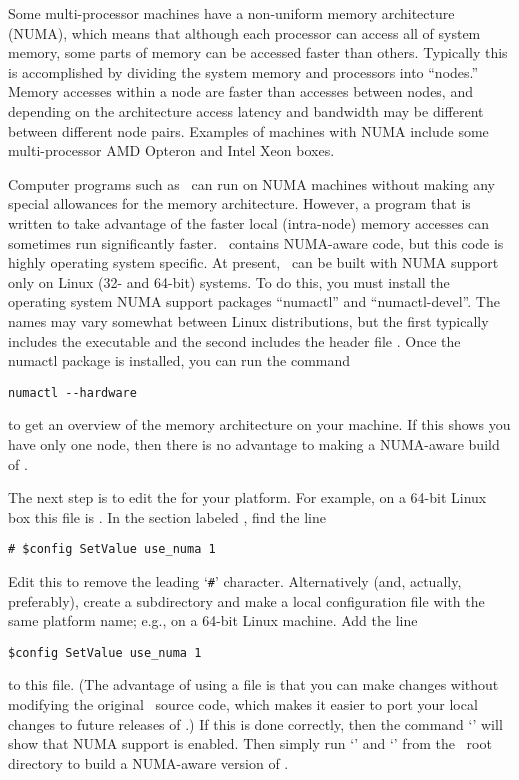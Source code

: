 Some multi-processor machines have a non-uniform memory
architecture (NUMA), which means that although each processor can access
all of system memory, some parts of memory can be accessed faster than
others.  Typically this is accomplished by dividing the system memory
and processors into ``nodes.''  Memory accesses within a node are faster
than accesses between nodes, and depending on the architecture access
latency and bandwidth may be different between different node pairs.
Examples of machines with NUMA include some multi-processor AMD Opteron
and Intel Xeon boxes.

Computer programs such as \OOMMF\ can run on NUMA machines without
making any special allowances for the memory architecture.  However, a
program that is written to take advantage of the faster local
(intra-node) memory accesses can sometimes run significantly faster.
\OOMMF\ contains NUMA-aware code, but this code is highly operating
system specific.  At present, \OOMMF\ can be built with NUMA support
only on Linux (32- and 64-bit) systems.  To do this, you must install
the operating system NUMA support packages ``numactl'' and
``numactl-devel''.  The names may vary somewhat between Linux
distributions, but the first typically includes the executable
 and the second includes the header file .  Once
the numactl package is installed, you can run the command
\begin{verbatim}
numactl --hardware
\end{verbatim}
to get an overview of the memory architecture on your machine.  If this
shows you have only one node, then there is no advantage to making a
NUMA-aware build of \OOMMF.

The next step is to edit the  for your platform.
For example, on a 64-bit Linux box this file is
. 
In the section labeled , find the line
\begin{verbatim}
# $config SetValue use_numa 1
\end{verbatim}
Edit this to remove the leading `\verb+#+' character.  Alternatively
(and, actually, preferably), create a  subdirectory and make a
local configuration file with the same platform name; e.g.,
 on a 64-bit Linux machine.  Add
the line
\begin{verbatim}
$config SetValue use_numa 1
\end{verbatim}
to this file.  (The advantage of using a 
file is that you can make changes without modifying the original \OOMMF\
source code, which makes it easier to port your local changes to future
releases of \OOMMF.)  If this is done correctly, then the command
`\cd{tclsh oommf.tcl +platform}' will show that NUMA support is enabled.
Then simply run `\cd{tclsh oommf.tcl pimake distclean}' and
`' from the \OOMMF\ root directory to build a
NUMA-aware version of \OOMMF.


